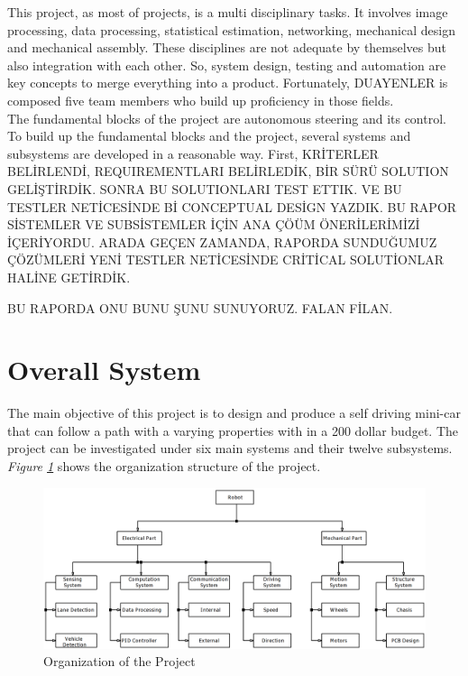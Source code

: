 \documentclass[a4paper,12pt]{article}
\begin{document}
	This project, as most of projects, is a multi disciplinary tasks. It involves image processing, data processing, statistical estimation, networking, mechanical design and mechanical assembly. These disciplines are not adequate by themselves but also integration with each other. So, system design, testing and automation are key concepts to merge everything into a product. Fortunately, DUAYENLER is composed five team members who build up proficiency in those fields.\\
	
	The fundamental blocks of the project are autonomous steering and its control. To build up the fundamental blocks and the project, several systems and subsystems are developed in a reasonable way. First, KRİTERLER BELİRLENDİ, REQUIREMENTLARI BELİRLEDİK, BİR SÜRÜ SOLUTION GELİŞTİRDİK. SONRA BU SOLUTIONLARI  TEST ETTIK. VE BU TESTLER NETİCESİNDE Bİ CONCEPTUAL DESİGN YAZDIK. BU RAPOR SİSTEMLER VE SUBSİSTEMLER İÇİN ANA ÇÖÜM ÖNERİLERİMİZİ İÇERİYORDU. ARADA GEÇEN ZAMANDA, RAPORDA SUNDUĞUMUZ ÇÖZÜMLERİ YENİ TESTLER NETİCESİNDE CRİTİCAL SOLUTİONLAR HALİNE GETİRDİK.
	
	BU RAPORDA ONU BUNU ŞUNU SUNUYORUZ. FALAN FİLAN.
	
	
		\section{Overall System} 
	
			The main objective of this project is to design and produce a self driving mini-car that can follow a path with a varying properties with in a 200 dollar budget. The project can be investigated under six main systems and their twelve subsystems. \textit{Figure \ref{fig:organization}} shows the organization structure of the project.

	
	
	

	\begin{figure}[h]
		\includegraphics[width=\textwidth,center]{images/system}
		\caption{Organization of the Project}\label{fig:organization}
	\end{figure}
	
\end{document}
